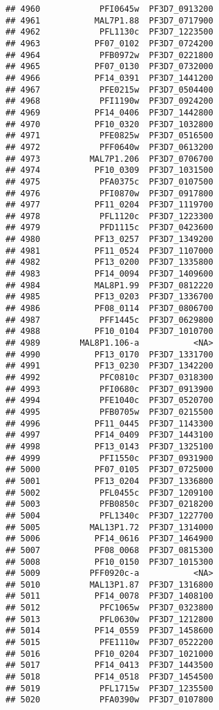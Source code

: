 \documentclass{article}\usepackage[]{graphicx}\usepackage[]{color}
\makeatletter
\newenvironment{kframe}{%
 \def\at@end@of@kframe{}%
 \ifinner\ifhmode%
  \def\at@end@of@kframe{\end{minipage}}%
  \begin{minipage}{\columnwidth}%
 \fi\fi%
 \def\FrameCommand##1{\hskip\@totalleftmargin \hskip-\fboxsep
 \colorbox{shadecolor}{##1}\hskip-\fboxsep
     \hskip-\linewidth \hskip-\@totalleftmargin \hskip\columnwidth}%
 \MakeFramed {\advance\hsize-\width
   \@totalleftmargin\z@ \linewidth\hsize
   \@setminipage}}%
 {\par\unskip\endMakeFramed%
 \at@end@of@kframe}
\newenvironment{knitrout}{}{} %
\makeatother
\begin{document}
\begin{knitrout}
\begin{kframe}
\begin{verbatim}
## 4960            PFI0645w  PF3D7_0913200
## 4961           MAL7P1.88  PF3D7_0717900
## 4962            PFL1130c  PF3D7_1223500
## 4963           PF07_0102  PF3D7_0724200
## 4964            PFB0972w  PF3D7_0221800
## 4965           PF07_0130  PF3D7_0732000
## 4966           PF14_0391  PF3D7_1441200
## 4967            PFE0215w  PF3D7_0504400
## 4968            PFI1190w  PF3D7_0924200
## 4969           PF14_0406  PF3D7_1442800
## 4970           PF10_0320  PF3D7_1032800
## 4971            PFE0825w  PF3D7_0516500
## 4972            PFF0640w  PF3D7_0613200
## 4973          MAL7P1.206  PF3D7_0706700
## 4974           PF10_0309  PF3D7_1031500
## 4975            PFA0375c  PF3D7_0107500
## 4976            PFI0870w  PF3D7_0917800
## 4977           PF11_0204  PF3D7_1119700
## 4978            PFL1120c  PF3D7_1223300
## 4979            PFD1115c  PF3D7_0423600
## 4980           PF13_0257  PF3D7_1349200
## 4981           PF11_0524  PF3D7_1107000
## 4982           PF13_0200  PF3D7_1335800
## 4983           PF14_0094  PF3D7_1409600
## 4984           MAL8P1.99  PF3D7_0812220
## 4985           PF13_0203  PF3D7_1336700
## 4986           PF08_0114  PF3D7_0806700
## 4987            PFF1445c  PF3D7_0629800
## 4988           PF10_0104  PF3D7_1010700
## 4989        MAL8P1.106-a           <NA>
## 4990           PF13_0170  PF3D7_1331700
## 4991           PF13_0230  PF3D7_1342200
## 4992            PFC0810c  PF3D7_0318300
## 4993            PFI0680c  PF3D7_0913900
## 4994            PFE1040c  PF3D7_0520700
## 4995            PFB0705w  PF3D7_0215500
## 4996           PF11_0445  PF3D7_1143300
## 4997           PF14_0409  PF3D7_1443100
## 4998           PF13_0143  PF3D7_1325100
## 4999            PFI1550c  PF3D7_0931900
## 5000           PF07_0105  PF3D7_0725000
## 5001           PF13_0204  PF3D7_1336800
## 5002            PFL0455c  PF3D7_1209100
## 5003            PFB0850c  PF3D7_0218200
## 5004            PFL1340c  PF3D7_1227700
## 5005          MAL13P1.72  PF3D7_1314000
## 5006           PF14_0616  PF3D7_1464900
## 5007           PF08_0068  PF3D7_0815300
## 5008           PF10_0150  PF3D7_1015300
## 5009          PFF0920c-a           <NA>
## 5010          MAL13P1.87  PF3D7_1316800
## 5011           PF14_0078  PF3D7_1408100
## 5012            PFC1065w  PF3D7_0323800
## 5013            PFL0630w  PF3D7_1212800
## 5014           PF14_0559  PF3D7_1458600
## 5015            PFE1110w  PF3D7_0522200
## 5016           PF10_0204  PF3D7_1021000
## 5017           PF14_0413  PF3D7_1443500
## 5018           PF14_0518  PF3D7_1454500
## 5019            PFL1715w  PF3D7_1235500
## 5020            PFA0390w  PF3D7_0107800

\end{verbatim}
\end{kframe}
\end{knitrout}
\end{document}
